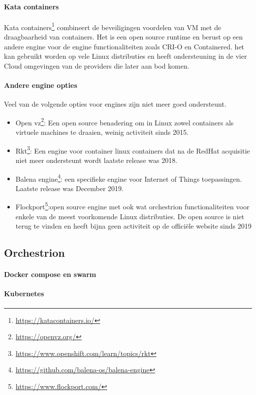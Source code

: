 \paragraph{Kata containers}
Kata containers\footnote{\url{https://katacontainers.io/}} combineert de beveiligingen voordelen van VM met de draagbaarheid van containers.  Het is een open source runtime en berust op een andere engine voor  de engine functionaliteiten zoals CRI-O en Containered. het kan gebruikt worden op vele Linux distributies en heeft ondersteuning in de vier Cloud omgevingen van de providers die later aan bod komen.
\paragraph{Andere engine opties}
Veel van de volgende opties voor engines zijn niet meer goed ondersteunt.
\begin{itemize}
    \item Open vz\footnote{\url{https://openvz.org/}}: Een open source benadering om in Linux zowel containers als virtuele machines te draaien, weinig activiteit sinds 2015.
    \item Rkt\footnote{\url{https://www.openshift.com/learn/topics/rkt}}: Een engine voor container linux containers dat na de RedHat acquisitie niet meer ondersteunt wordt  laatste release was 2018.
    \item Balena engine\footnote{\url{https://github.com/balena-os/balena-engine}}: een specifieke engine voor Internet of Things toepassingen.  Laatste release was December 2019.
    \item Flockport\footnote{\url{https://www.flockport.com/}}:open source engine met ook wat orchestrion functionaliteiten voor enkele van de meest voorkomende Linux distributies. De open source is niet terug te vinden en heeft bijna geen activiteit op de officiële website sinds 2019
\end{itemize}


\subsection{Orchestrion}
\paragraph{Docker compose en swarm}
\paragraph{Kubernetes}

